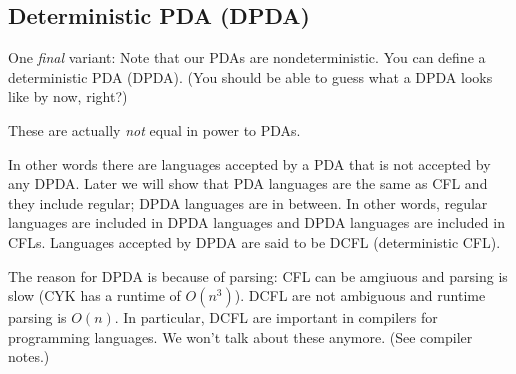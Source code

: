 \newpage
\subsection{Deterministic PDA (DPDA)}

One \textit{ final} variant:
Note that our PDAs are nondeterministic.
You can define a deterministic PDA (DPDA).
(You should be able to guess what a DPDA looks like by now, right?)

These are actually \textit{ not} equal in power to PDAs.

In other words there are languages accepted by a PDA that is not accepted
by any DPDA.
Later we will show that PDA languages are the same as CFL and they include
regular; DPDA languages are in between.
In other words, regular languages are included in DPDA languages and DPDA
languages are included in CFLs.
Languages accepted by DPDA are said to be DCFL (deterministic CFL).

The reason for DPDA is because of parsing:
CFL can be amgiuous and parsing is slow (CYK has a runtime of $O(n^3)$).
DCFL are not ambiguous and runtime parsing is $O(n)$.
In particular, DCFL are important in compilers for programming languages.
We won't talk about these anymore.
(See compiler notes.)


